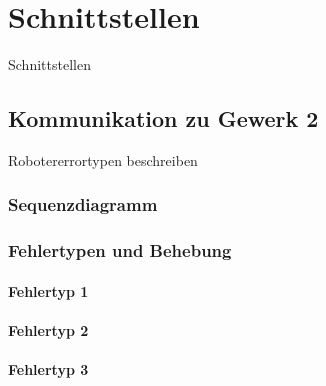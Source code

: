 
\chapter{Schnittstellen}
\label{sec:Schnittstellen}

Schnittstellen

\section{Kommunikation zu Gewerk 2}


\label{sec:Gewerk2Protokoll}

Robotererrortypen beschreiben

\subsection{Sequenzdiagramm}
\label{sec:sequenzdiagram}


\subsection{Fehlertypen und Behebung}
\label{sec:Error}

\subsubsection{Fehlertyp 1}
\subsubsection{Fehlertyp 2}
\subsubsection{Fehlertyp 3}
